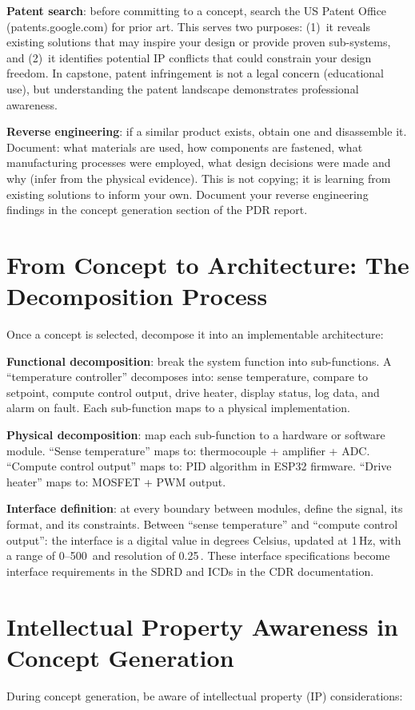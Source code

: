 \textbf{Patent search}: before committing to a concept, search the US Patent Office (patents.google.com) for prior art. This serves two purposes: (1)~it reveals existing solutions that may inspire your design or provide proven sub-systems, and (2)~it identifies potential IP conflicts that could constrain your design freedom. In capstone, patent infringement is not a legal concern (educational use), but understanding the patent landscape demonstrates professional awareness.

\textbf{Reverse engineering}: if a similar product exists, obtain one and disassemble it. Document: what materials are used, how components are fastened, what manufacturing processes were employed, what design decisions were made and why (infer from the physical evidence). This is not copying; it is learning from existing solutions to inform your own. Document your reverse engineering findings in the concept generation section of the PDR report.

\section{From Concept to Architecture: The Decomposition Process}
Once a concept is selected, decompose it into an implementable architecture:

\textbf{Functional decomposition}: break the system function into sub-functions. A ``temperature controller'' decomposes into: sense temperature, compare to setpoint, compute control output, drive heater, display status, log data, and alarm on fault. Each sub-function maps to a physical implementation.

\textbf{Physical decomposition}: map each sub-function to a hardware or software module. ``Sense temperature'' maps to: thermocouple + amplifier + ADC. ``Compute control output'' maps to: PID algorithm in ESP32 firmware. ``Drive heater'' maps to: MOSFET + PWM output.

\textbf{Interface definition}: at every boundary between modules, define the signal, its format, and its constraints. Between ``sense temperature'' and ``compute control output'': the interface is a digital value in degrees Celsius, updated at 1\,Hz, with a range of 0--500\,\degC{} and resolution of 0.25\,\degC{}. These interface specifications become interface requirements in the SDRD and ICDs in the CDR documentation.



\section{Intellectual Property Awareness in Concept Generation}
During concept generation, be aware of intellectual property (IP) considerations:

